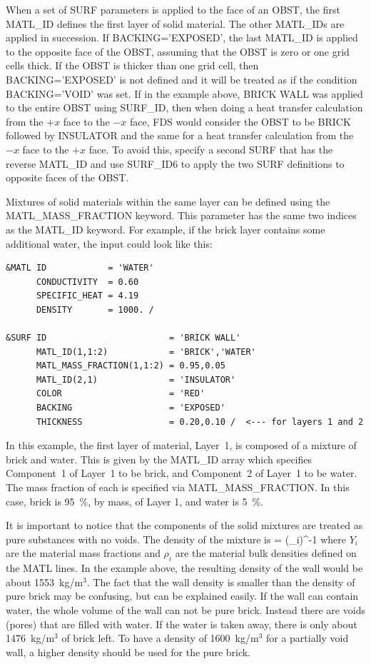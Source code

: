 \documentclass[11pt]{book}
\begin{document}
When a set of {\ct SURF} parameters is applied to the face of an {\ct OBST}, the first {\ct MATL\_ID} defines the first layer of solid material. The other {\ct MATL\_ID}s are applied in succession. If {\ct BACKING='EXPOSED'}, the last {\ct MATL\_ID} is applied to the opposite face of the {\ct OBST}, assuming that the {\ct OBST} is zero or one grid cells thick. If the {\ct OBST} is thicker than one grid cell, then {\ct BACKING='EXPOSED'} is not defined and it will be treated as if the condition {\ct BACKING='VOID'} was set. If in the example above, {\ct BRICK WALL} was applied to the entire {\ct OBST} using {\ct SURF\_ID}, then when doing a heat transfer calculation from the $+x$ face to the $-x$ face, FDS would consider the {\ct OBST} to be {\ct BRICK} followed by {\ct INSULATOR} and the same for a heat transfer
calculation from the $-x$ face to the $+x$ face.  To avoid this, specify a second {\ct SURF} that has the reverse {\ct MATL\_ID} and use {\ct SURF\_ID6} to apply the two {\ct SURF} definitions to opposite faces of the {\ct OBST}.

Mixtures of solid materials within the same layer can be defined using
the {\ct MATL\_MASS\_FRACTION} keyword. This parameter has the same
two indices as the {\ct MATL\_ID} keyword. For example, if the
brick layer contains some additional water, the input could look like this:
\begin{lstlisting}
&MATL ID            = 'WATER'
      CONDUCTIVITY  = 0.60
      SPECIFIC_HEAT = 4.19
      DENSITY       = 1000. /

&SURF ID                        = 'BRICK WALL'
      MATL_ID(1,1:2)            = 'BRICK','WATER'
      MATL_MASS_FRACTION(1,1:2) = 0.95,0.05
      MATL_ID(2,1)              = 'INSULATOR'
      COLOR                     = 'RED'
      BACKING                   = 'EXPOSED'
      THICKNESS                 = 0.20,0.10 /  <--- for layers 1 and 2
\end{lstlisting}
In this example, the first layer of material, Layer~1, is composed of a mixture of
brick and water. This is given by the {\ct MATL\_ID} array which specifies
Component~1 of Layer~1 to be brick, and Component~2 of
Layer~1 to be water. The mass fraction of each is specified via {\ct MATL\_MASS\_FRACTION}. In this
case, brick is 95~\%, by mass, of Layer 1, and water is 5~\%.

It is important to notice that the components of the solid mixtures
are treated as pure substances with no voids. The density of the
mixture is
\be
\rho = \left(\sum_i\right)^{-1}
\ee
where $Y_i$ are the material mass fractions and $\rho_i$ are the
material bulk densities defined on the {\ct MATL} lines. In the
example above, the resulting density of the wall would be about
1553~kg/m$^3$. The fact that the wall density is smaller than the
density of pure brick may be confusing, but can be explained easily.
If the wall can contain water, the whole volume of the wall can not be
pure brick. Instead there are voids (pores) that are
filled with water. If the water is taken away, there is only about
1476~kg/m$^3$ of brick left. To have a density of 1600~kg/m$^3$ for a
partially void wall, a higher density should be used for the pure
brick.
\end{document}
